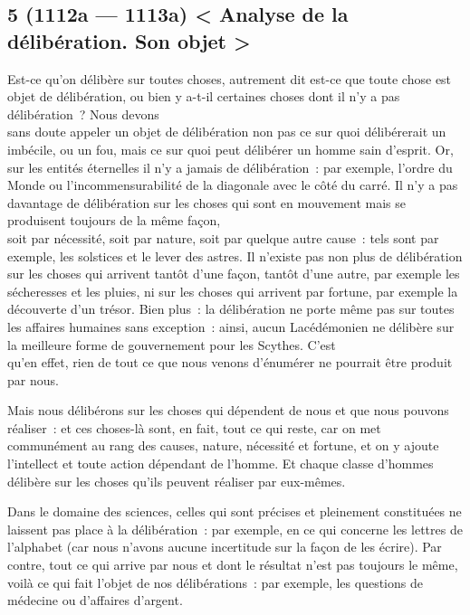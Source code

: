 \documentclass[french,twoside]{book} %
\begin{document}
\subsection[{5 (1112a — 1113a) < Analyse de la délibération. Son objet >}]{5 (1112a — 1113a) < Analyse de la délibération. Son objet >}
\noindent Est-ce qu’on délibère sur toutes choses, autrement dit est-ce que toute chose est objet de délibération, ou bien y a-t-il certaines choses dont il n’y a pas délibération ? Nous devons \\
sans doute appeler un objet de délibération non pas ce sur quoi délibérerait un imbécile, ou un fou, mais ce sur quoi peut délibérer un homme sain d’esprit. Or, sur les entités éternelles il n’y a jamais de délibération : par exemple, l’ordre du Monde ou l’incommensurabilité de la diagonale avec le côté du carré. Il n’y a pas davantage de délibération sur les choses qui sont en mouvement mais se produisent toujours de la même façon, \\
soit par nécessité, soit par nature, soit par quelque autre cause : tels sont par exemple, les solstices et le lever des astres. Il n’existe pas non plus de délibération sur les choses qui arrivent tantôt d’une façon, tantôt d’une autre, par exemple les sécheresses et les pluies, ni sur les choses qui arrivent par fortune, par exemple la découverte d’un trésor. Bien plus : la délibération ne porte même pas sur toutes les affaires humaines sans exception : ainsi, aucun Lacédémonien ne délibère sur la meilleure forme de gouvernement pour les Scythes. C’est \\
qu’en effet, rien de tout ce que nous venons d’énumérer ne pourrait être produit par nous.\par
Mais nous délibérons sur les choses qui dépendent de nous et que nous pouvons réaliser : et ces choses-là sont, en fait, tout ce qui reste, car on met communément au rang des causes, nature, nécessité et fortune, et on y ajoute l’intellect et toute action dépendant de l’homme. Et chaque classe d’hommes délibère sur les choses qu’ils peuvent réaliser par eux-mêmes.\par
 Dans le domaine des sciences, celles qui sont précises et pleinement constituées ne laissent pas place à la délibération : par exemple, en ce qui concerne les lettres de l’alphabet (car nous n’avons aucune incertitude sur la façon de les écrire). Par contre, tout ce qui arrive par nous et dont le résultat n’est pas toujours le même, voilà ce qui fait l’objet de nos délibérations : par exemple, les questions de médecine ou d’affaires d’argent. \\
\end{document}
